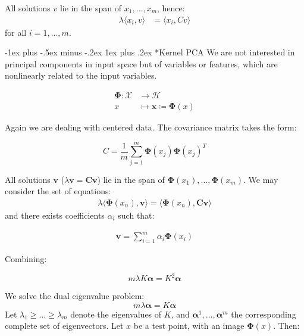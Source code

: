 \documentclass[10pt,landscape]{article}
\makeatletter
\renewcommand{\subsubsection}{\@startsection{subsubsection}{3}{0mm}%
                                {-1ex plus -.5ex minus -.2ex}%
                                {1ex plus .2ex}%
                                {\normalfont\small\bfseries}}
\makeatother
\begin{document}
\begin{multicols}{3}
All solutions $v$ lie in the span of $x_1, \dots, x_m$, hence:
\begin{align*}
\lambda \langle x_i, v \rangle & = \langle x_i, C v \rangle
\end{align*}
for all $i = 1, \dots, m$.

\subsubsection*{Kernel PCA}
We are not interested in principal components in input space but of variables or features, which are nonlinearly related to the input variables.

\begin{align*}
\mathbf{\Phi} : \mathcal{X} & \rightarrow \mathcal{H} \\
x & \mapsto \mathbf{x} \coloneqq \mathbf{\Phi}(x)
\end{align*}

Again we are dealing with centered data. The covariance matrix takes the form:

\begin{equation*}
C = \frac{1}{m} \sum_{j=1}^{m} \mathbf{\Phi}(x_j) \mathbf{\Phi}(x_j)^{T}
\end{equation*}

All solutions $\mathbf{v}$ ($\lambda \mathbf{v} = \mathbf{C} \mathbf{v}$) lie in the span of $\mathbf{\Phi}(x_1), \dots, \mathbf{\Phi}(x_m)$. We may consider the set of equations:
\begin{align*}
\lambda \langle \mathbf{\Phi}(x_n), \mathbf{v} \rangle = \langle \mathbf{\Phi}(x_n), \mathbf{C}\mathbf{v} \rangle
\end{align*}
and there exists coefficients $\alpha_i$ such that:

\begin{align*}
\mathbf{v} = \sum_{i=1}^{m} \alpha_i \mathbf{\Phi}(x_i)
\end{align*}

Combining:

\begin{equation*}
m \lambda K \mathbf{\alpha} = K^2 \mathbf{\alpha}
\end{equation*}

We solve the dual eigenvalue problem:
\begin{equation*}
\boxed{m \lambda \mathbf{\alpha} = K \mathbf{\alpha}}
\end{equation*}
Let $\lambda_1 \geq \dots \geq \lambda_m$ denote the eigenvalues of $K$, and $\mathbf{\alpha}^1, \dots, \mathbf{\alpha}^m$ the corresponding complete set of eigenvectors. Let $x$ be a test point, with an image $\mathbf{\Phi}(x)$. Then:


\end{multicols}
\end{document}
